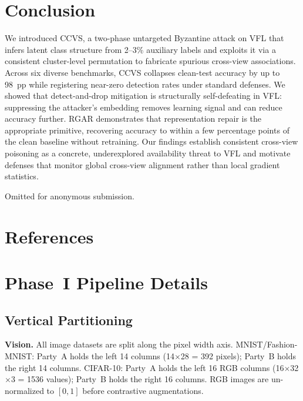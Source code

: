 \documentclass{article}
\begin{document}
\section{Conclusion}
\label{sec:conclusion}

We introduced CCVS, a two-phase untargeted Byzantine attack on VFL that
infers latent class structure from 2--3\% auxiliary labels and exploits it
via a consistent cluster-level permutation to fabricate spurious cross-view
associations.
Across six diverse benchmarks, CCVS collapses clean-test accuracy by up to
98~pp while registering near-zero detection rates under standard defenses.
We showed that detect-and-drop mitigation is structurally self-defeating
in VFL: suppressing the attacker's embedding removes learning signal and
can reduce accuracy further.
RGAR demonstrates that representation repair is the appropriate primitive,
recovering accuracy to within a few percentage points of the clean baseline
without retraining.
Our findings establish consistent cross-view poisoning as a concrete,
underexplored availability threat to VFL and motivate defenses that monitor
global cross-view alignment rather than local gradient statistics.

\begin{ack}
Omitted for anonymous submission.
\end{ack}

\section*{References}
{\small


}

\appendix

\section{Phase~I Pipeline Details}
\label{app:phase1}

\subsection{Vertical Partitioning}
\textbf{Vision.}
All image datasets are split along the pixel width axis.
MNIST/Fashion-MNIST: Party~A holds the left 14 columns (14$\times$28 = 392
pixels); Party~B holds the right 14 columns.
CIFAR-10: Party~A holds the left 16 RGB columns (16$\times$32$\times$3 = 1536
values); Party~B holds the right 16 columns.
RGB images are un-normalized to $[0,1]$ before contrastive augmentations.
\end{document}
